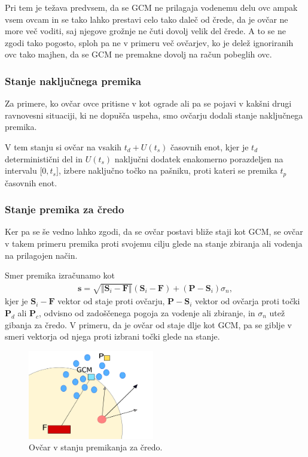 Pri tem je težava predvsem, da se GCM ne prilagaja vodenemu delu ovc ampak vsem ovcam in se tako lahko prestavi celo tako daleč od črede, da je ovčar ne more več voditi, saj njegove grožnje ne čuti dovolj velik del črede. A to se ne zgodi tako pogosto, sploh pa ne v primeru več ovčarjev, ko je delež ignoriranih ovc tako majhen, da se GCM ne premakne dovolj na račun pobeglih ovc.

\subsubsection{Stanje naključnega premika}

Za primere, ko ovčar ovce pritisne v kot ograde ali pa se pojavi v kakšni drugi ravnovesni situaciji, ki ne dopušča uspeha, smo ovčarju dodali stanje naključnega premika.

V tem stanju si ovčar na vsakih $t_d + U(t_s)$ časovnih enot, kjer je $t_d$ deterministični del in $U(t_s)$ naključni dodatek enakomerno porazdeljen na intervalu $\lbrack 0, t_s\rbrack$, izbere naključno točko na pašniku, proti kateri se premika $t_p$ časovnih enot.

\subsubsection{Stanje premika za čredo}

Ker pa se še vedno lahko zgodi, da se ovčar postavi bliže staji kot GCM, se ovčar v takem primeru premika proti svojemu cilju glede na stanje zbiranja ali vodenja na prilagojen način.

Smer premika izračunamo kot
\begin{align}
\mathbf{s} = \sqrt{\Vert \mathbf{S}_i - \mathbf{F}\Vert}(\mathbf{S}_i - \mathbf{F}) + (\mathbf{P} - \mathbf{S}_i) \sigma_n, \label{eq:zadaj}
\end{align}
kjer je $\mathbf{S}_i - \mathbf{F}$ vektor od staje proti ovčarju, $\mathbf{P} - \mathbf{S}_i$ vektor od ovčarja proti točki $\mathbf{P}_d$ ali $\mathbf{P}_c$, odvisno od zadoščenega pogoja za vodenje ali zbiranje, in $\sigma_n$ utež gibanja za čredo. V primeru, da je ovčar od staje dlje kot GCM, pa se giblje v smeri vektorja od njega proti izbrani točki glede na stanje.

\begin{figure}[ht]  %
	\centering
	\includegraphics[width=0.49\textwidth]{../poglavja/images/zadaj.pdf}
	\caption[Stanje premika za čredo]{Ovčar v stanju premikanja za čredo.} %
	\label{fig:zadaj}
\end{figure}

